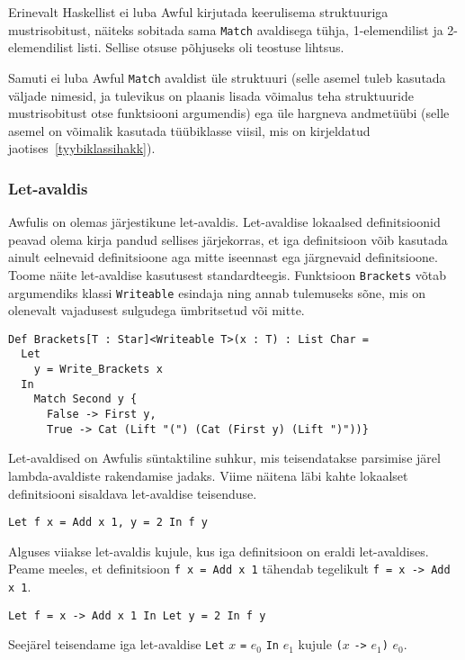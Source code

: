 \documentclass[12pt]{article}
\begin{document}
        Erinevalt Haskellist ei luba Awful kirjutada keerulisema struktuuriga mustrisobitust, näiteks sobitada sama \verb!Match! avaldisega tühja, 1-elemendilist ja 2-elemendilist listi. Sellise otsuse põhjuseks oli teostuse lihtsus.

        Samuti ei luba Awful \verb!Match! avaldist üle struktuuri (selle asemel tuleb kasutada väljade nimesid, ja tulevikus on plaanis lisada võimalus teha struktuuride mustrisobitust otse funktsiooni argumendis) ega üle hargneva andmetüübi (selle asemel on võimalik kasutada tüübiklasse viisil, mis on kirjeldatud jaotises~\ref{tyybiklassihakk}).
      \subsubsection{Let-avaldis}\label{letavaldis}
        Awfulis on olemas järjestikune let-avaldis. Let-avaldise lokaalsed definitsioonid peavad olema kirja pandud sellises järjekorras, et iga definitsioon võib kasutada ainult eelnevaid definitsioone aga mitte iseennast ega järgnevaid definitsioone. Toome näite let-avaldise kasutusest standardteegis. Funktsioon \verb!Brackets! võtab argumendiks klassi \verb!Writeable! esindaja ning annab tulemuseks sõne, mis on olenevalt vajadusest sulgudega ümbritsetud või mitte.

        \begin{verbatim}Def Brackets[T : Star]<Writeable T>(x : T) : List Char =
  Let
    y = Write_Brackets x
  In
    Match Second y {
      False -> First y,
      True -> Cat (Lift "(") (Cat (First y) (Lift ")"))}\end{verbatim}

        Let-avaldised on Awfulis süntaktiline suhkur, mis teisendatakse parsimise järel lambda-avaldiste rakendamise jadaks. Viime näitena läbi kahte lokaalset definitsiooni sisaldava let-avaldise teisenduse.

        \begin{verbatim}Let f x = Add x 1, y = 2 In f y\end{verbatim}

        Alguses viiakse let-avaldis kujule, kus iga definitsioon on eraldi let-avaldises. Peame meeles, et definitsioon \verb!f x = Add x 1! tähendab tegelikult \verb!f = x -> Add x 1!.

        \begin{verbatim}Let f = x -> Add x 1 In Let y = 2 In f y\end{verbatim}

        Seejärel teisendame iga let-avaldise \verb!Let! $x$ \verb!=! $e_0$ \verb!In! $e_1$ kujule \verb!(!$x$ \verb!->! $e_1$\verb!)! $e_0$.
\end{document}
